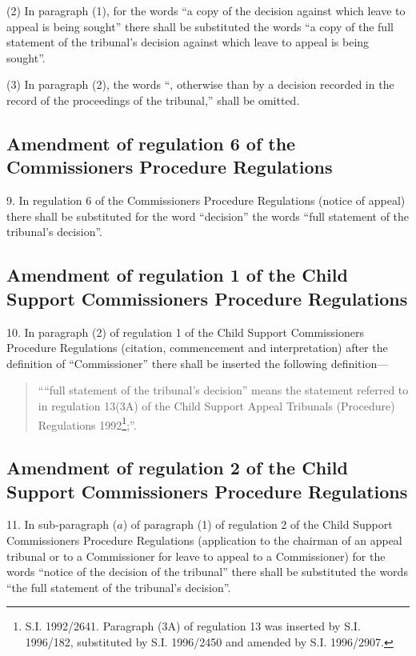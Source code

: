 \documentclass[12pt,a4paper]{article}
\begin{document}
(2) In paragraph (1), for the words “a copy of the decision against which leave to appeal is being sought” there shall be substituted the words “a copy of the full statement of the tribunal’s decision against which leave to appeal is being sought”.

(3) In paragraph (2), the words “, otherwise than by a decision recorded in the record of the proceedings of the tribunal,” shall be omitted.

\subsection[9. Amendment of regulation 6 of the Commissioners Procedure Regulations]{Amendment of regulation 6 of the Commissioners Procedure Regulations}

9.  In regulation 6 of the Commissioners Procedure Regulations (notice of appeal) there shall be substituted for the word “decision” the words “full statement of the tribunal’s decision”.

\subsection[10. Amendment of regulation 1 of the Child Support Commissioners Procedure Regulations]{Amendment of regulation 1 of the Child Support Commissioners Procedure Regulations}

10.  In paragraph (2) of regulation 1 of the Child Support Commissioners Procedure Regulations (citation, commencement and interpretation) after the definition of “Commissioner” there shall be inserted the following definition—
\begin{quotation}
““full statement of the tribunal’s decision” means the statement referred to in regulation 13(3A) of the Child Support Appeal Tribunals (Procedure) Regulations 1992\footnote{\frenchspacing S.I. 1992/2641. Paragraph (3A) of regulation 13 was inserted by S.I. 1996/182, substituted by S.I. 1996/2450 and amended by S.I. 1996/2907.};”.
\end{quotation}

\subsection[11. Amendment of regulation 2 of the Child Support Commissioners Procedure Regulations]{Amendment of regulation 2 of the Child Support Commissioners Procedure Regulations}

11.  In sub-paragraph ($a$) of paragraph (1) of regulation 2 of the Child Support Commissioners Procedure Regulations (application to the chairman of an appeal tribunal or to a Commissioner for leave to appeal to a Commissioner) for the words “notice of the decision of the tribunal” there shall be substituted the words “the full statement of the tribunal’s decision”.
\end{document}
